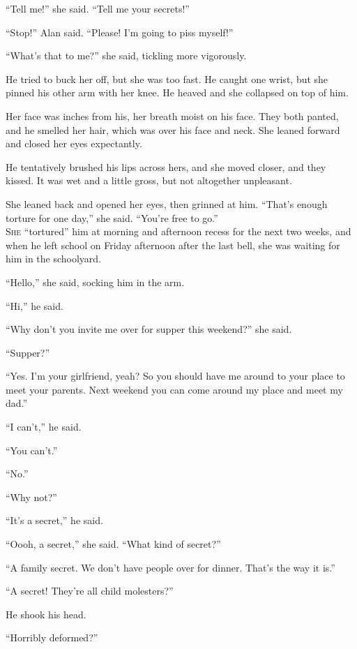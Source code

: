 \documentclass{article}
\begin{document}
``Tell me!'' she said.  ``Tell me your secrets!''

``Stop!'' Alan said.  ``Please!  I'm going to piss myself!''

``What's that to me?'' she said, tickling more vigorously.

He tried to buck her off, but she was too fast.  He caught one wrist,
but she pinned his other arm with her knee.  He heaved and she
collapsed on top of him.

Her face was inches from his, her breath moist on his face.  They both
panted, and he smelled her hair, which was over his face and neck. 
She leaned forward and closed her eyes expectantly.

He tentatively brushed his lips across hers, and she moved closer, and
they kissed.  It was wet and a little gross, but not altogether
unpleasant.

She leaned back and opened her eyes, then grinned at him.  ``That's
enough torture for one day,'' she said.  ``You're free to go.''
\\
\lettrine[lines=3, lhang=.5, nindent=0pt, findent=2pt]{S}{he} ``tortured'' him at morning and afternoon recess for the next two
weeks, and when he left school on Friday afternoon after the last
bell, she was waiting for him in the schoolyard.

``Hello,'' she said, socking him in the arm.

``Hi,'' he said.

``Why don't you invite me over for supper this weekend?'' she said.

``Supper?''

``Yes.  I'm your girlfriend, yeah?  So you should have me around to
your place to meet your parents.  Next weekend you can come around my
place and meet my dad.''

``I can't,'' he said.

``You can't.''

``No.''

``Why not?''

``It's a secret,'' he said.

``Oooh, a secret,'' she said.  ``What kind of secret?''

``A family secret.  We don't have people over for dinner.  That's the
way it is.''

``A secret!  They're all child molesters?''

He shook his head.

``Horribly deformed?''
\end{document}

